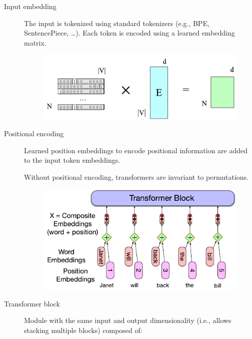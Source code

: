 \begin{description}
    \item[Input embedding] 
        The input is tokenized using standard tokenizers (e.g., BPE, SentencePiece, \dots). Each token is encoded using a learned embedding matrix.

        \begin{figure}[H]
            \centering
            \includegraphics[width=0.45\linewidth]{./img/_transformer_embedding.pdf}
        \end{figure}

    \item[Positional encoding] 
        Learned position embeddings to encode positional information are added to the input token embeddings.

        \begin{remark}
            Without positional encoding, transformers are invariant to permutations.
        \end{remark}

        \begin{figure}[H]
            \centering
            \includegraphics[width=0.4\linewidth]{./img/_positional_encoding.pdf}
        \end{figure}

    \item[Transformer block] 
        Module with the same input and output dimensionality (i.e., allows stacking multiple blocks) composed of:
\end{description}
